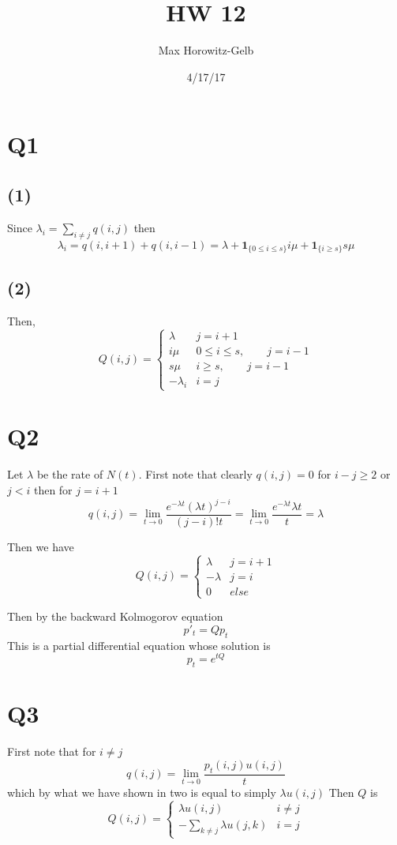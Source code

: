 \documentclass{article}
\title{HW 12}
\author{Max Horowitz-Gelb}
\date{4/17/17}
\begin{document}
\maketitle
\section*{Q1}
\subsection*{(1)}
Since $\lambda_i = \sum_{i \neq j} q(i,j)$ then
$$
\lambda_i = q(i,i+1) + q(i, i-1) = \lambda + \mathbf{1}_{\{0 \leq i \leq s\}}i\mu + \mathbf{1}_{\{i \geq s\}}s\mu 
$$

\subsection*{(2)}
Then,
$$
Q(i,j) = 
\begin{cases}
\lambda & j = i +1 \\
i \mu  & 0 \leq i \leq s, \qquad j = i -1 \\
s \mu & i \geq s, \qquad j = i -1 \\
-\lambda_i & i = j 
\end{cases}
$$

\section*{Q2}
Let $\lambda$ be the rate of $N(t)$.
First note that clearly 
$q(i,j) = 0$ for $i -j \geq 2$ or $j < i$
then for $j = i + 1$
$$
q(i,j) = \lim_{t \to 0} \frac{e^{-\lambda t}(\lambda t)^{j-i}}{(j-i)! t} = \lim_{t \to 0} \frac{e^{-\lambda t}\lambda t}{t} = \lambda
$$

Then we have
$$
Q(i,j) = \begin{cases}
\lambda & j = i +1 \\
-\lambda & j = i \\
0 & else
\end{cases}
$$

Then by the backward Kolmogorov equation 
$$
p'_t = Qp_t
$$
This is a partial differential equation whose solution is 
$$
p_t = e^{tQ}
$$

\section*{Q3}

First note that for $i \neq j$
$$
q(i,j) = \lim_{t \to 0} \frac{p_t(i,j) u(i,j)}{t}
$$
which by what we have shown in two is equal to simply $\lambda u(i,j)$
Then $Q$ is 
$$
Q(i,j) = \begin{cases}
\lambda u(i,j) & i \neq j \\
-\sum_{k \neq j} \lambda u(j,k) & i = j 
\end{cases} 
$$
\end{document}

